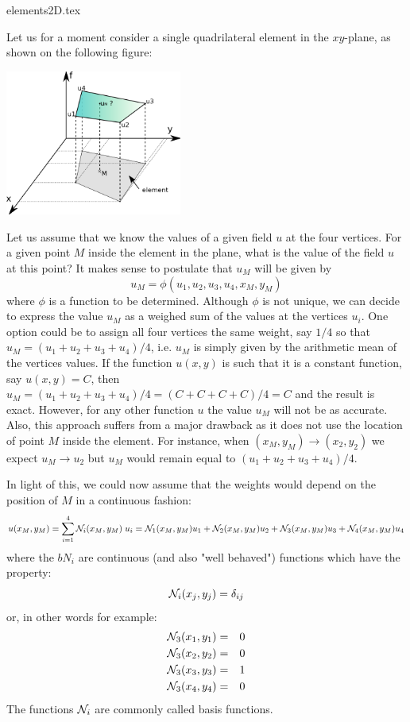\begin{flushright} {\tiny {\color{gray} elements2D.tex}} \end{flushright}

Let us for a moment consider a single quadrilateral element in the $xy$-plane, 
as shown on the following figure:
\begin{center}
\includegraphics[width=5.8cm]{images/shape}
\end{center}
Let us assume that we know the values of a given field $u$ at the four vertices.
For a given point $M$ inside the element in the plane, what is the value of the 
field $u$ at this point?
It makes sense to postulate that $u_M$ will be given  by 
\[
u_M= \phi(u_1,u_2,u_3,u_4,x_M,y_M) 
\]
where $\phi$ is a function to be determined. Although $\phi$ is not unique, we can 
decide to express the value $u_M$ as a weighed sum of the values at the vertices $u_i$.
One option could be to assign all four vertices the same weight, say $1/4$ so that 
$u_M=(u_1+u_2+u_3+u_4)/4$, i.e. $u_M$ is simply given by the arithmetic mean 
of the vertices values. 
If the function $u(x,y)$ is such that it is a constant function, say $u(x,y)=C$, 
then $u_M=(u_1+u_2+u_3+u_4)/4=(C+C+C+C)/4=C$ and the result is exact.
However, for any other function $u$ the value $u_M$ will not be as accurate.
Also, this approach suffers from a major drawback as it does
not use the location of point $M$ inside the element. For instance, when 
$(x_M,y_M) \rightarrow (x_2,y_2)$ we expect $u_M \rightarrow u_2$ but $u_M$ would 
remain equal to $(u_1+u_2+u_3+u_4)/4$.

In light of this, we could now assume that the weights would depend on the position 
of $M$ in a continuous fashion:
\begin{equation}
u(x_M,y_M) = \sum_{i=1}^4 {\mathcal{N}}_i(x_M,y_M)\;  u_i
= {\mathcal{N}}_1(x_M,y_M) u_1 + {\mathcal{N}}_2(x_M,y_M) u_2 + {\mathcal{N}}_3(x_M,y_M) u_3 + {\mathcal{N}}_4(x_M,y_M) u_4 
\end{equation}
where the $bN_i$ are continuous (and also "well behaved") functions which have the property:
\[
{\mathcal{N}}_i(x_j,y_j)=\delta_{ij}
\]
or, in other words for example: 
\begin{eqnarray}
{\mathcal{N}}_3(x_1,y_1) &=& 0 \nonumber\\
{\mathcal{N}}_3(x_2,y_2) &=& 0 \nonumber\\
{\mathcal{N}}_3(x_3,y_3) &=& 1 \nonumber\\
{\mathcal{N}}_3(x_4,y_4) &=& 0 
\end{eqnarray}
The functions ${\mathcal{N}}_i$ are commonly called basis functions. 

